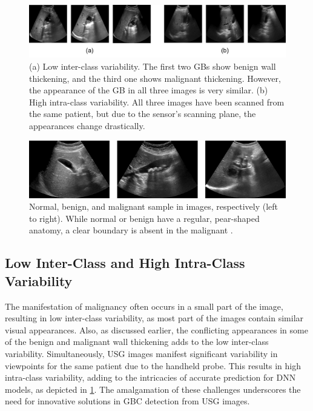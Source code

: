 \begin{figure}[t]
    \centering
    \includegraphics[width=0.9\linewidth]{figs/wsod/teaser.png}
    \caption[Low inter-class and high intra-class variability of GBC in USG data]{(a) Low inter-class variability. The first two GBs show benign wall thickening, and the third one shows malignant thickening. However, the appearance of the GB in all three images is very similar. (b) High intra-class variability. All three images have been scanned from the same patient, but due to the sensor's scanning plane, the appearances change drastically.}
    \label{wsod_fig:variability_teaser}
\end{figure}

\begin{figure}[t]
    \centering
    \includegraphics[width=\linewidth]{figs/non_reg_anatomy.png}
    \caption[Visualization of non-regular anatomy of the malignant gallbladders]{Normal, benign, and malignant \gb sample in \usg images, respectively (left to right). While normal or benign \gb have a regular, pear-shaped anatomy, a clear boundary is absent in the malignant \gb.}
    \label{fig:non_reg_anatomy}
\end{figure}


\subsection{Low Inter-Class and High Intra-Class Variability}
%
The manifestation of malignancy often occurs in a small part of the image, resulting in low inter-class variability, as most part of the images contain similar visual appearances. Also, as discussed earlier, the conflicting appearances in some of the benign and malignant wall thickening adds to the low inter-class variability. Simultaneously, USG images manifest significant variability in viewpoints for the same patient due to the handheld probe. This results in high intra-class variability, adding to the intricacies of accurate prediction for DNN models, as depicted in \cref{wsod_fig:variability_teaser}. The amalgamation of these challenges underscores the need for innovative solutions in GBC detection from USG images.

